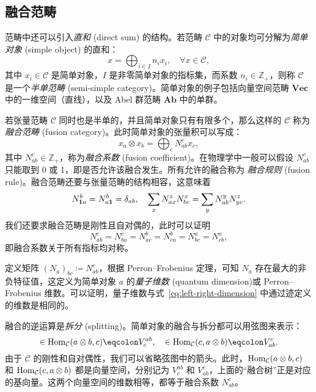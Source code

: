 \subsection{融合范畴}

范畴中还可以引入\emph{直和} (direct sum) 的结构。若范畴 $\mathcal{C}$ 中的对象均可分解为\emph{简单对象} (simple object) 的直和：
\begin{equation}
  x = \bigoplus_{i\in I} n_i x_i, \quad \forall x \in \mathcal{C},
\end{equation}
其中 $x_i\in\mathcal{C}$ 是简单对象，$I$ 是非零简单对象的指标集，而系数 $n_i\in\mathbb{Z}_+$，则称 $\mathcal{C}$ 是一个\emph{半单范畴} (semi-simple category)。简单对象的例子包括向量空间范畴 $\mathbf{Vec}$ 中的一维空间（直线），以及 Abel 群范畴 $\mathbf{Ab}$ 中的单群。

若张量范畴 $\mathcal{C}$ 同时也是半单的，并且简单对象只有有限多个，那么这样的 $\mathcal{C}$ 称为\emph{融合范畴} (fusion category)。此时简单对象的张量积可以写成：
\begin{equation}
  x_a \otimes x_b = \bigoplus_c N_{ab}^c x_c,
\end{equation}
其中 $N_{ab}^c\in\mathbb{Z}_+$，称为\emph{融合系数} (fusion coefficient)。在物理学中一般可以假设 $N_{ab}^c$ 只能取到 0 或 1，即是否允许该融合发生。所有允许的融合称为 \emph{融合规则} (fusion rule)。融合范畴还要与张量范畴的结构相容，这意味着
\begin{equation}
  N_{\mathbf{1} a}^b = N_{a\mathbf{1}}^b = \delta_{ab}, \quad
  \sum_x N_{ax}^z N_{bc}^x = \sum_y N_{ab}^y N_{yc}^z.
\end{equation}
我们还要求融合范畴是刚性且自对偶的，此时可以证明
\begin{equation}
  N_{ab}^c = N_{ba}^c = N_{ac}^b = N_{ca}^b = N_{bc}^a = N_{cb}^a,
\end{equation}
即融合系数关于所有指标均对称。

定义矩阵 $(N_a)_{bc}\coloneq N_{ab}^c$，根据 Perron--Frobenius 定理，可知 $N_a$ 存在最大的非负特征值，这定义为简单对象 $a$ 的\emph{量子维数} (quantum dimension)或 Perron--Frobenius 维数。可以证明，量子维数与式~\eqref{eq:left-right-dimension} 中通过迹定义的维数是相同的。

融合的逆运算是\emph{拆分} (splitting)。简单对象的融合与拆分都可以用弦图来表示：
\begin{equation}
  
  \in \Hom_{\mathcal{C}}(a\otimes b, c) \eqcolon V^{ab}_c, \quad
  
  \in \Hom_{\mathcal{C}}(c, a\otimes b) \eqcolon V_{ab}^c.
\end{equation}
由于 $\mathcal{C}$ 的刚性和自对偶性，我们可以省略弦图中的箭头。此时，$\operatorname{Hom}_{\mathcal{C}}(a\otimes b,c)$ 和 $\operatorname{Hom}_{\mathcal{C}}(c,a\otimes b)$ 都是向量空间，分别记为 $V^{ab}_c$ 和 $V_{ab}^c$，上面的“融合树”正是对应的基向量。这两个向量空间的维数相等，都等于融合系数 $N_{ab}^c$。

